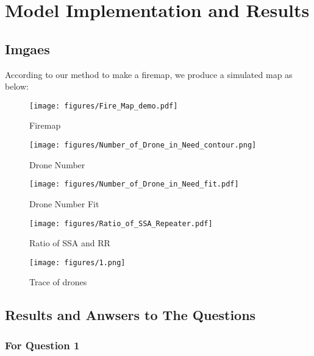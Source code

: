 \documentclass{mcmthesis}
\begin{document}
\section{Model Implementation and Results}
\subsection{Imgaes}
According to our method to make a firemap, we produce a simulated map as below:

\begin{figure}[htbp]
  \centering
  \texttt{[image: figures/Fire\_Map\_demo.pdf]}
  \caption{Firemap}
  \label{Firemap}
\end{figure}

\begin{figure}[htbp]
  \centering
  \texttt{[image: figures/Number\_of\_Drone\_in\_Need\_contour.png]}
  \caption{Drone Number}
  \label{Drone Number}
\end{figure}

\begin{figure}[htbp]
  \centering
  \texttt{[image: figures/Number\_of\_Drone\_in\_Need\_fit.pdf]}
  \caption{Drone Number Fit}
  \label{Drone Number Fit}
\end{figure}

\begin{figure}[htbp]
  \centering
  \texttt{[image: figures/Ratio\_of\_SSA\_Repeater.pdf]}
  \caption{Ratio of SSA and RR}
  \label{Ratio of SSA and RR}
\end{figure}

\begin{figure}[htbp]
  \centering
  \texttt{[image: figures/1.png]}
  \caption{Trace of drones}
  \label{Trace}
\end{figure}




\subsection{Results and Anwsers to The Questions}
\subsubsection{For Question 1}
\end{document}
